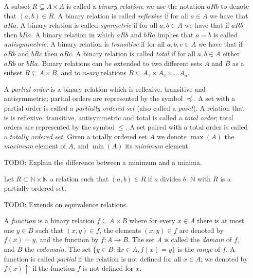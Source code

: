 A subset $R \subseteq A \times A$ is called a \emph{binary relation}; we use the notation $aRb$ to denote that $\left(a, b\right) \in R$. A binary relation is called \emph{reflexive} if for all $a \in A$ we have that $aRa$. A binary relation is called \emph{symmetric} if for all $a, b \in A$ we have that if $aRb$ then $bRa$. A binary relation in which $aRb$ and $bRa$ implies that $a = b$ is called \emph{antisymmetric}. A binary relation is \emph{transitive} if for all $a, b, c \in A$ we have that if $aRb$ and $bRc$ then $aRc$. A binary relation is called \emph{total} if for all $a, b \in A$ either $aRb$ or $bRa$. Binary relations can be extended to two different sets $A$ and $B$ as a subset $R \subseteq A \times B$, and to \emph{n-ary} relations $R \subseteq A_1 \times A_2 \times \dots A_n$.

A \emph{partial order} is a binary relation which is reflexive, transitive and antisymmetric; partial orders are represented by the symbol $\preceq$. A set with a partial order is called a \emph{partially ordered set} (also called a \emph{poset}). A relation that is is reflexive, transitive, antisymmetric and total is called a \emph{total order}; total orders are represented by the symbol $\leq$. A set paired with a total order is called a \emph{totally ordered set}. Given a totally ordered set $A$ we denote $\max(A)$ the \emph{maximum} element of $A$, and $\min(A)$ its \emph{minimum} element.

{\color{red} TODO: Explain the difference between a minimum and a minima.}

\begin{example}
Let $R \subset \mathbb{N} \times \mathbb{N}$ a relation such that $(a, b) \in R$ if $a$ divides $b$. $\mathbb{N}$ with $R$ is a partially ordered set.
\end{example}

{\color{red} TODO: Extends on equivalence relations.}

A \emph{function} is a binary relation $f \subseteq A \times B$ where for every $x \in A$ there is at most one $y \in B$ such that $\left(x, y\right) \in f$, the elements $\left(x, y\right) \in f$ are denoted by $f(x)=y$, and the function by $f : A \rightarrow B$. The set $A$ is called the \emph{domain} of $f$, and $B$ the \emph{codomain}. The set $\{ y \in B : \exists x \in A , f(x) = y\}$ is the \emph{range} of $f$. A function is called \emph{partial} if the relation is not defined for all $x \in A$; we denoted by $f(x) \uparrow$ if the function $f$ is not defined for $x$. 

